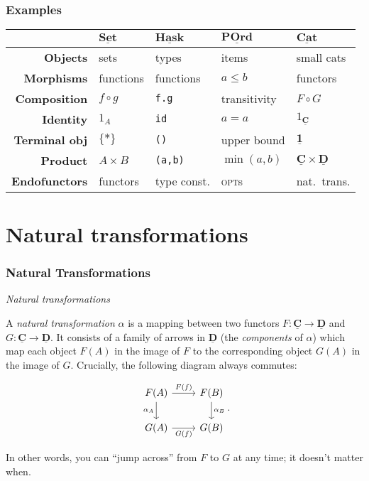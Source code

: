 \documentclass[10pt]{beamer}
\newcommand{\Cat}[1]{\ensuremath{\underline{\mathbf{#1}}}}
\theoremstyle{definition}
\theoremstyle{remark}
\numberwithin{equation}{section}
\begin{document}
\begin{frame}[fragile]
  \frametitle{Examples}
  \begin{tabular}{r l l l l}\toprule
    & $\Cat{Set}$ & $\Cat{Hask}$ & $\Cat{POrd}$ & $\Cat{Cat}$ \\\midrule
    \textbf{Objects} & sets & types & items & small cats \\
    \textbf{Morphisms} & functions & functions & $a \leq b$ & functors \\
    \textbf{Composition} & $f \circ g$ & \lstinline!f.g! & transitivity & $F \circ G$ \\
    \textbf{Identity} & $1_A$ & {\lstinline!id!} & $a = a$ & $1_{\Cat{C}}$ \\
    \textbf{Terminal obj\rlap{.}} & $\{*\}$ & \lstinline!()! & upper bound & $\Cat{1}$ \\
    \textbf{Product} & $A \times B$ & \lstinline!(a,b)! & $\min(a,b)$ & $\Cat{C} \times \Cat{D}$ \\
    \textbf{Endofunctors} & functors & type const. & \textsc{opt}s & nat.\ trans.\\\bottomrule
  \end{tabular}
\end{frame}

\section{Natural transformations}

\begin{frame}[fragile]
  \frametitle{Natural Transformations}

  \emph{Natural transformations}

  A \emph{natural transformation} $\alpha$ is a mapping between two functors $F\colon
  \Cat{C} \rightarrow \Cat{D}$ and $G\colon \Cat{C} \rightarrow \Cat{D}$. It consists of a family of
  arrows in $\Cat{D}$ (the \emph{components} of $\alpha$) which map each object
  $F(A)$ in the image of $F$ to the corresponding object $G(A)$ in the image of
  $G$. Crucially, the following diagram always commutes:\vspace{-\baselineskip}

  \[
    \begin{tikzcd}
      F(A) \arrow[swap]{d}{\alpha_A} \arrow{r}{F(f)} & F(B) \arrow{d}{\alpha_B} \\
      G(A) \arrow[swap]{r}{G(f)} & G(B)
    \end{tikzcd}\rlap{.}
  \]

  In other words, you can ``jump across'' from $F$ to $G$ at any time; it
  doesn't matter when.
\end{frame}
\end{document}
